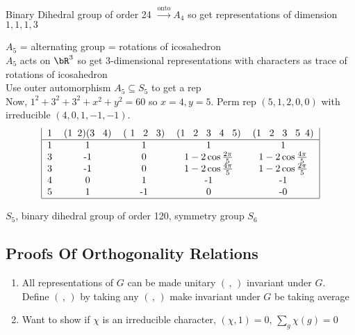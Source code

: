 \begin{example}
    Binary Dihedral group of order 24 $\stackrel{\text{onto}}{\to} A_4$ so get representations of dimension $1,1,1,3$ 
\end{example}

\begin{example}
    $A_5$ = alternating group = rotations of icosahedron\\
    $A_5$ acts on $\bR^3$ so get 3-dimensional representations with characters as trace of rotations of icosahedron \\
    Use outer automorphism $A_5 \subseteq S_5$ to get a rep \\ 
    Now, $1^2 + 3^2 + 3^2 + x^2+y^2 = 60$ so $x=4,y=5$. Perm rep $(5, 1, 2, 0, 0)$ with irreducible $(4, 0, 1, -1, -1)$. 
    \[\begin{tabular}{|c c c c c|}
        1 & (1 \,2)(3 \, 4) & ( 1 \, 2 \, 3) & (1 \, 2 \, 3 \, 4 \, 5) & (1 \, 2 \, 3 \, 5 \,4)\\ \hline 
        1 & 1 & 1 & 1 &  1\\ 
        3 & -1 & 0 & $1 - 2\cos \frac{2 \pi}{5}$ & $1 - 2\cos \frac{4 \pi}{5}$ \\ 
        3 & -1 & 0 & $1 - 2\cos \frac{4 \pi }{5}$ & $1 - 2 \cos \frac{2 \pi }{5}$ \\ 
        4 & 0 & 1 & -1 & -1 \\ 
        5 & 1 & -1 & 0 & -0\\ \hline 
    \end{tabular} \]
\end{example}

\begin{example}
    $S_5$, binary dihedral group of order 120, symmetry group $S_6$ 
\end{example}

\subsection{Proofs Of Orthogonality Relations}

\begin{enumerate}
    \item All representations of $G$ can be made unitary $( \, , \, )$ invariant under $G$. \\
    Define $( \,, \,)$ by taking any $( \, , \,)$ make invariant under $G$ be taking average 
    \item Want to show if $\chi$ is an irreducible character, $(\chi, 1 ) = 0$, $\sum_g \chi(g)=0$ \\
\end{enumerate}

